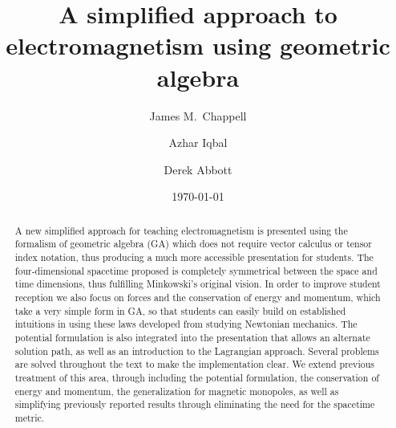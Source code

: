 \documentclass[12pt,aps,prb,preprint]{revtex4}   %
\begin{document}

\title{A simplified approach to electromagnetism using geometric algebra}  
\author{James M.~Chappell}
\author{Azhar Iqbal}
\author{Derek Abbott}
\date{\today}

\begin{abstract}
A new simplified approach for teaching electromagnetism is presented using the formalism of geometric algebra (GA) which does not require vector calculus or tensor index notation, thus producing a much more accessible presentation for students.  The four-dimensional spacetime proposed is completely symmetrical between the space and time dimensions, thus fulfilling Minkowski's original vision.
In order to improve student reception we also focus on forces and the conservation of energy and momentum, which take a very simple form in GA, so that students can easily build on established intuitions in using these laws developed from studying Newtonian mechanics.  
The potential formulation is also integrated into the presentation that allows an alternate solution path, as well as an introduction to the Lagrangian approach. Several problems are solved throughout the text to make the implementation clear.  
We extend previous treatment of this area, through including the potential formulation, the conservation of energy and momentum, the generalization for magnetic monopoles, as well as simplifying previously reported results through eliminating the need for the spacetime metric.
\end{abstract}

\maketitle
\end{document}

